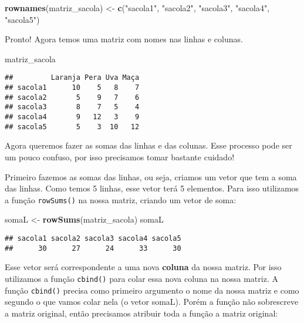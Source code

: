 \documentclass[]{book}
\newenvironment{Shaded}{\begin{snugshade}}{\end{snugshade}}
\newcommand{\KeywordTok}[1]{\textcolor[rgb]{0.13,0.29,0.53}{\textbf{#1}}}
\newcommand{\NormalTok}[1]{#1}
\newcommand{\StringTok}[1]{\textcolor[rgb]{0.31,0.60,0.02}{#1}}
\theoremstyle{definition}
\theoremstyle{definition}
\theoremstyle{definition}
\theoremstyle{remark}
\begin{document}
\begin{Shaded}
\begin{Highlighting}[]
\KeywordTok{rownames}\NormalTok{(matriz_sacola) <-}\StringTok{ }\KeywordTok{c}\NormalTok{(}\StringTok{"sacola1"}\NormalTok{, }\StringTok{"sacola2"}\NormalTok{, }\StringTok{"sacola3"}\NormalTok{, }\StringTok{"sacola4"}\NormalTok{, }\StringTok{"sacola5"}\NormalTok{)}
\end{Highlighting}
\end{Shaded}

Pronto! Agora temos uma matriz com nomes nas linhas e colunas.

\begin{Shaded}
\begin{Highlighting}[]
\NormalTok{matriz_sacola}
\end{Highlighting}
\end{Shaded}

\begin{verbatim}
##         Laranja Pera Uva Maça
## sacola1      10    5   8    7
## sacola2       5    9   7    6
## sacola3       8    7   5    4
## sacola4       9   12   3    9
## sacola5       5    3  10   12
\end{verbatim}

Agora queremos fazer as somas das linhas e das colunas. Esse processo pode ser um pouco confuso, por isso precisamos tomar bastante cuidado!

Primeiro fazemos as somas das linhas, ou seja, criamos um vetor que tem a soma das linhas. Como temos 5 linhas, esse vetor terá 5 elementos. Para isso utilizamos a função \texttt{rowSums()} na nossa matriz, criando um vetor de soma:

\begin{Shaded}
\begin{Highlighting}[]
\NormalTok{somaL <-}\StringTok{ }\KeywordTok{rowSums}\NormalTok{(matriz_sacola)}
\NormalTok{somaL}
\end{Highlighting}
\end{Shaded}

\begin{verbatim}
## sacola1 sacola2 sacola3 sacola4 sacola5 
##      30      27      24      33      30
\end{verbatim}

Esse vetor será correspondente a uma nova \textbf{coluna} da nossa matriz. Por isso utilizamos a função \texttt{cbind()} para colar essa nova coluna na nossa matriz. A função \texttt{cbind()} precisa como primeiro argumento o nome da nossa matriz e como segundo o que vamos colar nela (o vetor somaL). Porém a função não sobrescreve a matriz original, então precisamos atribuir toda a função a matriz original:
\end{document}
